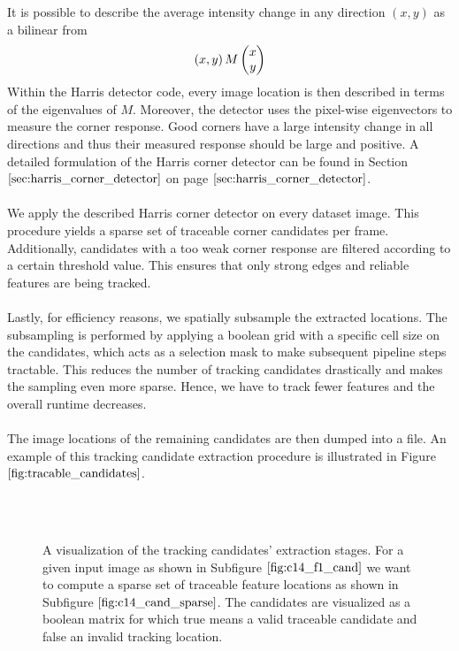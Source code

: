 It is possible to describe the average intensity change in any direction $(x,y)$
as a bilinear from
\begin{equation}
\left( x,y \right) M \colvec{x}{y}	
\end{equation}
Within the Harris detector code, every image location is then described in terms of the eigenvalues of $M$. Moreover, the detector uses the pixel-wise eigenvectors to measure the corner response. Good corners have a large intensity change in all directions and thus their measured response should be large and positive. A detailed formulation of the Harris corner detector can be found in Section $\ref{sec:harris_corner_detector}$ on page $\pageref{sec:harris_corner_detector}$. \\ \\
We apply the described Harris corner detector on every dataset image. This procedure yields a sparse set of traceable corner candidates per frame. Additionally, candidates with a too weak corner response are filtered according to a certain threshold value. This ensures that only strong edges and reliable features are being tracked. \\ \\
Lastly, for efficiency reasons, we spatially subsample the extracted locations. The subsampling is performed by applying a boolean grid with a specific cell size on the candidates, which acts as a selection mask to make subsequent pipeline steps tractable. This reduces the number of tracking candidates drastically and makes the sampling even more sparse. Hence, we have to track fewer features and the overall runtime decreases. \\ \\
The image locations of the remaining candidates are then dumped into a file. An example of this tracking candidate extraction procedure is illustrated in Figure $\ref{fig:tracable_candidates}$. \\ \\
\begin{figure}[H]
\begin{center}
~
\end{center}
\caption[Tracking Candidates]{A visualization of the tracking candidates' extraction stages. For a given input image as shown in Subfigure $\ref{fig:c14_f1_cand}$ we want to compute a sparse set of traceable feature locations as shown in Subfigure $\ref{fig:c14_cand_sparse}$. The candidates are visualized as a boolean matrix for which true means a valid traceable candidate and false an invalid tracking location.}
\label{fig:tracable_candidates}
\end{figure}
